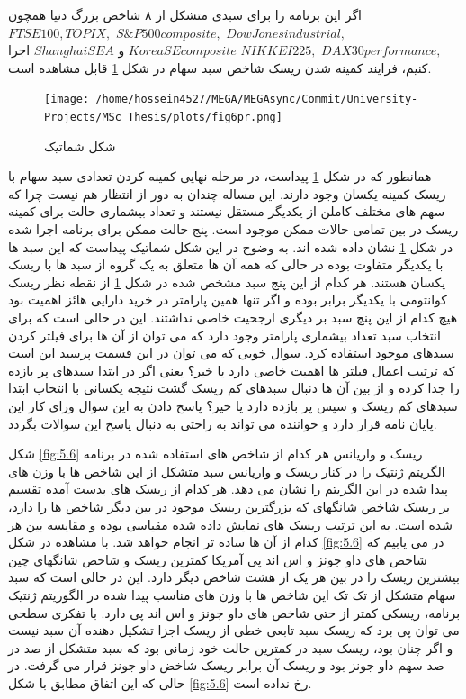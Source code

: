 \documentclass[a4paper,titlepage,12pt,fleqn,oneside]{report}
\begin{document}
	اگر این برنامه را برای سبدی متشکل از ۸ شاخص بزرگ دنیا همچون 
	$Dow Jones industrial, $
	$S\&P 500 composite,$
	$ FTSE 100, TOPIX ,$
	$DAX 30 performance,$
	$ NIKKEI 225,$
	$ Korea SE composite $
	و
	$ Shanghai SE A$
	اجرا کنیم، فرایند کمینه شدن ریسک شاخص سبد سهام در شکل 
	\ref{fig:5.5}
	قابل مشاهده است.
	\begin{figure}[ptb]
		\centering
		\texttt{[image: /home/hossein4527/MEGA/MEGAsync/Commit/University-Projects/MSc\_Thesis/plots/fig6pr.png]}
		\caption{شکل شماتیک }
		\label{fig:5.5}
	\end{figure}
	همانطور که در شکل 
	\ref{fig:5.5}
	پیداست، در مرحله نهایی کمینه کردن تعدادی سبد سهام با ریسک کمینه یکسان وجود دارند. این مساله چندان به دور از انتظار هم نیست چرا که سهم های مختلف کاملن از یکدیگر مستقل نیستند و تعداد بیشماری حالت برای کمینه ریسک در بین تمامی حالات ممکن موجود است. پنج حالت ممکن برای برنامه اجرا شده در شکل 
	\ref{fig:5.5}
	نشان داده شده اند. به وضوح در این شکل شماتیک پیداست که این سبد ها با یکدیگر متفاوت بوده در حالی که همه آن ها متعلق به یک گروه از سبد ها با ریسک یکسان هستند.  هر کدام از این پنج سبد مشخص شده در شکل
	\ref{fig:5.5}
	از نقطه نظر ریسک کوانتومی با یکدیگر برابر بوده و اگر تنها همین پارامتر در خرید دارایی هائز اهمیت بود هیچ کدام از این پنچ سبد بر دیگری ارجحیت خاصی نداشتند. این در حالی است که برای انتخاب سبد تعداد بیشماری پارامتر وجود دارد که می توان از آن ها برای فیلتر کردن سبدهای موجود استفاده کرد. سوال خوبی که می توان در این قسمت پرسید این است که ترتیب اعمال فیلتر ها اهمیت خاصی دارد یا خیر؟ یعنی اگر در ابتدا سبدهای پر بازده را جدا کرده و از بین آن ها دنبال سبدهای کم ریسک گشت نتیجه یکسانی با انتخاب ابتدا سبدهای کم ریسک و سپس پر بازده دارد یا خیر؟ پاسخ دادن به این سوال ورای کار این پایان نامه قرار دارد و خواننده می تواند به راحتی به دنبال پاسخ این سوالات بگردد.
	
	شکل 
	\ref{fig:5.6}
	ریسک و واریانس هر کدام از شاخص های استفاده شده در برنامه الگریتم ژنتیک را در کنار ریسک و واریانس سبد متشکل از این شاخص ها با وزن های پیدا شده در این الگریتم را نشان می دهد. 
	هر کدام از ریسک های بدست آمده تقسیم بر ریسک شاخص شانگهای که بزرگترین ریسک  موجود در بین دیگر شاخص ها را دارد، شده است. به این ترتیب ریسک های نمایش داده شده مقیاسی بوده و مقایسه بین هر کدام از آن ها ساده تر انجام خواهد شد. با مشاهده در شکل 
	\ref{fig:5.6}
	در می یابیم که شاخص های داو جونز و اس اند پی آمریکا کمترین ریسک و شاخص شانگهای چین بیشترین ریسک را در بین هر یک از هشت شاخص دیگر دارد. این در حالی است که سبد سهام متشکل از تک تک این شاخص ها با وزن های مناسب پیدا شده در الگوریتم ژنتیک برنامه، ریسکی کمتر از حتی شاخص های داو جونز و اس اند پی دارد. با تفکری سطحی می توان پی برد که ریسک سبد تابعی خطی از ریسک اجزا تشکیل دهنده آن سبد نیست و اگر چنان بود، ریسک سبد در کمترین حالت خود زمانی بود که سبد متشکل از صد در صد سهم داو جونز بود و ریسک آن برابر ریسک شاخض داو جونز قرار می گرفت. در حالی که این اتفاق مطابق با شکل
	\ref{fig:5.6}
	رخ نداده است.
	
\end{document}
